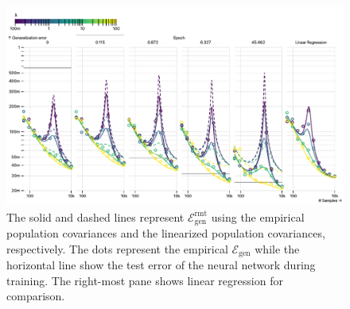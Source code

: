 \begin{figure}
    \centering
    \includegraphics[width=\linewidth]{chapters/deeprf/figs/art_emp.pdf}
    \caption{The solid and dashed lines represent $\mathcal E_\mathrm{gen}^\mathrm{rmt}$ using the empirical population covariances and the linearized population covariances, respectively. The dots represent the empirical $\mathcal E_\mathrm{gen}$ while the horizontal line show the test error of the neural network during training. The right-most pane shows linear regression for comparison.}
    \label{fig:art-lin}
\end{figure}
